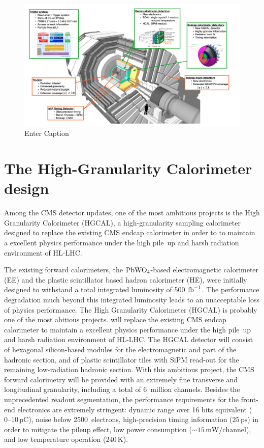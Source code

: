\begin{figure}
    \centering
    \includegraphics[width=0.75\linewidth]{Figures//HGCAL/Screenshot 2024-03-19 at 15.32.21.png}
    \caption{Enter Caption}
    \label{fig:CMSUpgrade}
\end{figure}

\section{The High-Granularity Calorimeter design}

Among the CMS detector updates, one of the most ambitious projects is the High Granularity Calorimeter (HGCAL), a high-granularity sampling calorimeter designed to replace the existing CMS endcap calorimeter in order to to maintain a excellent physics performance under the high pile~up and harsh radiation environment of HL-LHC.

The existing forward calorimeters, the $\textnormal{PbWO}_4$-based electromagnetic calorimeter (EE) and the plastic scintillator based hadron calorimeter (HE), were initially designed to withstand a total integrated luminosity of 500 $\textnormal{fb}^{-1}$. 
The performance degradation much beyond this integrated luminosity leads to an unacceptable loss of physics performance.
The High Granularity Calorimeter (HGCAL) is probably one of the most abitious projects.\cite{TDR} will replace the existing CMS endcap calorimeter to maintain a excellent physics performance under the high pile~up and harsh radiation environment of HL-LHC.
The HGCAL detector will consist of hexagonal silicon-based modules for the electromagnetic and part of the hadronic section, and of plastic scintillator tiles with SiPM read-out for the remaining low-radiation hadronic section.
With this ambitious project, the CMS forward calorimetry will be provided with an extremely fine transverse and longitudinal granularity, including a total of 6~million channels.
Besides the unprecedented readout segmentation, the performance requirements for the front-end electronics are extremely stringent: dynamic range over 16 bits equivalent ($0–10\,\textrm{pC}$), noise below 2500~electrons, high-precision timing information ($25\,\textrm{ps}$) in order to mitigate the pileup effect, low power consumption ($\sim$$15\,\textrm{mW/channel}$), and low temperature operation ($240\,\textrm{K}$).

